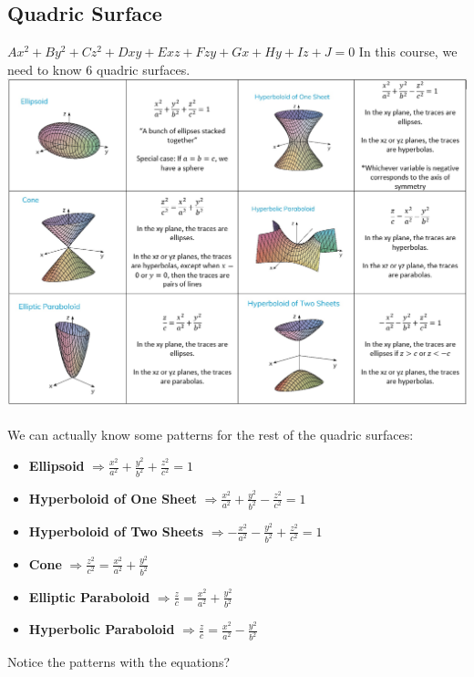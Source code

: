 \documentclass{article}
\begin{document}
\subsection{Quadric Surface}
$Ax^2+By^2+Cz^2+Dxy+Exz+Fzy+Gx+Hy+Iz+J=0$
\newline In this course, we need to know 6 quadric surfaces.\newline
\includegraphics[width=\textwidth]{quadric_surfaces.png}

\paragraph{} We can actually know some patterns for the rest of the quadric surfaces:
\begin{itemize}
    \item \textbf{Ellipsoid} $\Rightarrow \frac{x^2}{a^2}+\frac{y^2}{b^2}+\frac{z^2}{c^2}=1$
    \item \textbf{Hyperboloid of One Sheet} $\Rightarrow \frac{x^2}{a^2}+\frac{y^2}{b^2}-\frac{z^2}{c^2}=1$
    \item \textbf{Hyperboloid of Two Sheets} $\Rightarrow -\frac{x^2}{a^2}-\frac{y^2}{b^2}+\frac{z^2}{c^2}=1$
    \item \textbf{Cone} $\Rightarrow \frac{z^2}{c^2}=\frac{x^2}{a^2}+\frac{y^2}{b^2}$
    \item \textbf{Elliptic Paraboloid} $\Rightarrow  \frac{z}{c}=\frac{x^2}{a^2}+\frac{y^2}{b^2}$
    \item \textbf{Hyperbolic Paraboloid} $\Rightarrow  \frac{z}{c}=\frac{x^2}{a^2}-\frac{y^2}{b^2}$
\end{itemize}
Notice the patterns with the equations?
\newpage
\end{document}
